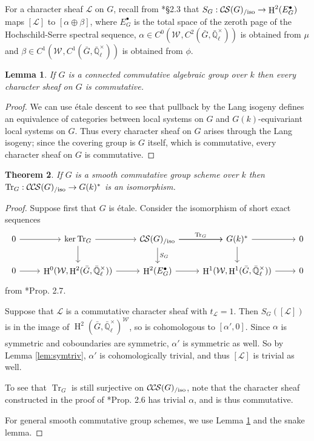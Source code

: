 \documentclass[10pt]{amsart}
\theoremstyle{plain}
\newtheorem{theorem}{Theorem}[section]
\newtheorem{lemma}[theorem]{Lemma}
\theoremstyle{definition}
\newcommand{\EE}{\mathbb{\bar Q}_\ell}
\newcommand{\Fq}{k}
\newcommand{\EEx}{\EE^\times}
\newcommand{\Weil}[1]{\mathcal{W}_{#1}}
\DeclareMathOperator{\Hh}{H}
\newcommand{\trFrob}[1]{t_{#1}}
\newcommand{\TrFrob}[1]{\operatorname{Tr}_{#1}}
\newcommand{\cs}[1]{{\mathcal{#1}}}
\newcommand{\CS}{{\mathcal{C\hskip-0.8pt S}}}
\newcommand{\CCS}{{\mathcal{C\hskip-.8pt C\hskip-0.8pt S}}}
\newcommand{\CSiso}[1]{\CS(#1)_{/\text{iso}}}
\newcommand{\CCSiso}[1]{\CCS(#1)_{/\text{iso}}}
\newcommand{\bG}{\bar{G}}
\begin{document}
For a character sheaf $\cs{L}$ on $G$, recall from \cite{cunningham-roe:13a}*{\S 2.3} that $S_G : \CSiso{G} \to \Hh^2(E_G^\bullet)$ maps
$[\cs{L}]$ to $[\alpha \oplus \beta]$, where $E_G^\bullet$ is the total space of the zeroth page
of the Hochschild-Serre spectral sequence, $\alpha \in C^0(\Weil{}, C^2(\bG, \EEx))$ is obtained from $\mu$ and
$\beta \in C^1(\Weil{}, C^1(\bG, \EEx))$ is obtained from $\phi$.

\begin{lemma} \label{lem:conncomm}
If $G$ is a connected commutative algebraic group over $\Fq$ then every character sheaf on $G$ is commutative.
\end{lemma}

\begin{proof}
We can use \'etale descent to see that pullback by the Lang isogeny defines an equivalence
of categories between local systems on $G$ and $G(\Fq)$-equivariant local systems on $G$.  Thus every character
sheaf on $G$ arises through the Lang isogeny; since the covering group is $G$ itself, which is commutative,
every character sheaf on $G$ is commutative.
\end{proof}

\begin{theorem} \label{thm:trfrobiso}
If $G$ is a smooth commutative group scheme over $\Fq$ then $\TrFrob{G} : \CCSiso{G} \to G(\Fq)^*$ is an isomorphism.
\end{theorem}

\begin{proof}
Suppose first that $G$ is \'etale.  Consider the isomorphism of short exact sequences
\[
\begin{tikzcd}
 0 \arrow{r} & \ker \TrFrob{G} \arrow{d} \arrow{r} & \CSiso{G}\arrow{d}{S_G} \arrow{r}{\TrFrob{G}} \arrow{r} & G(\Fq)^* \arrow{d} \arrow{r} & 0\\
  0 \arrow{r} & \Hh^0(\Weil{},\Hh^2(\bG,\EEx)) \arrow{r} & \Hh^2(E^\bullet_G) \arrow{r} & \Hh^1(\Weil{},\Hh^1(\bG,\EEx)) \arrow{r} & 0
 \end{tikzcd}
 \]
from \cite{cunningham-roe:13a}*{Prop. 2.7}.

Suppose that $\cs{L}$ is a commutative character sheaf
with $\trFrob{\cs{L}} = 1$.  Then $S_G([\cs{L}])$ is in the image of $\Hh^2(\bG, \EEx)^\Weil{}$, so is cohomologous to
$[\alpha', 0]$.  Since $\alpha$ is symmetric and coboundaries are symmetric, $\alpha'$ is symmetric as well.
So by Lemma \ref{lem:symtriv}, $\alpha'$ is cohomologically trivial, and thus $[\cs{L}]$ is trivial as well.

To see that $\TrFrob{G}$ is still surjective on $\CCSiso{G}$, note that the character sheaf constructed in the proof of
\cite{cunningham-roe:13a}*{Prop. 2.6} has trivial $\alpha$, and is thus commutative.

For general smooth commutative group schemes, we use Lemma \ref{lem:conncomm} and the snake lemma.
\end{proof}
\end{document}
